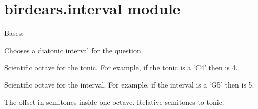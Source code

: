 \documentclass[letterpaper,10pt,english]{sphinxmanual}
\begin{document}
\section{birdears.interval module}
\label{\detokenize{birdears:birdears-interval-module}}\label{\detokenize{birdears:module-birdears.interval}}

\begin{fulllineitems}
\label{\detokenize{birdears:birdears.interval.Interval}}
Bases: 

Chooses a diatonic interval for the question.

\begin{fulllineitems}
\label{\detokenize{birdears:birdears.interval.Interval.tonic_octave}}
 \textendash{} Scientific octave for the tonic. For example, if
the tonic is a ‘C4’ then  is 4.

\end{fulllineitems}



\begin{fulllineitems}
 \textendash{} Scientific octave for the interval. For example,
if the interval is a ‘G5’ then  is 5.

\end{fulllineitems}


\begin{fulllineitems}
\label{\detokenize{birdears:birdears.interval.Interval.chromatic_offset}}
 \textendash{} The offset in semitones inside one octave.
Relative semitones to tonic.

\end{fulllineitems}



\end{fulllineitems}
\end{document}
